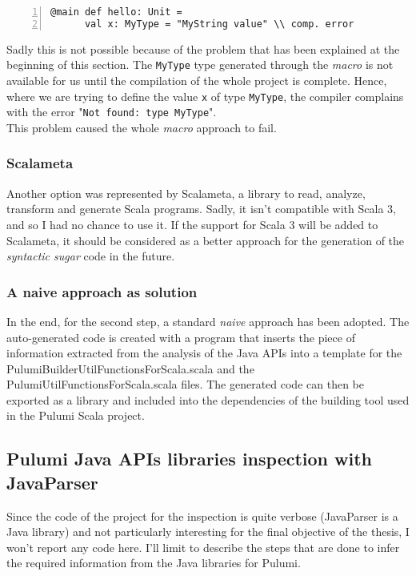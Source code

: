 \begin{minipage}{\linewidth}
  \begin{lstlisting}[numbers=left, numberstyle=\tiny, numbersep=-5pt, stepnumber=1]
    @main def hello: Unit = 
      val x: MyType = "MyString value" \\ comp. error
  \end{lstlisting}
\end{minipage}
Sadly this is not possible because of the problem that has been explained at the beginning of this section.
The \texttt{MyType} type generated through the \textit{macro} is not available for us until the compilation of the whole project is complete.
Hence, where we are trying to define the value \texttt{x} of type \texttt{MyType}, the compiler complains with the error "\texttt{Not found: type MyType}".\\
This problem caused the whole \textit{macro} approach to fail.


\subsubsection{Scalameta}
Another option was represented by Scalameta, a library to read, analyze, transform and generate Scala programs.
Sadly, it isn't compatible with Scala 3, and so I had no chance to use it.
If the support for Scala 3 will be added to Scalameta, it should be considered as a better approach for the generation of the \textit{syntactic sugar} code in the future.

\subsubsection{A naive approach as solution}
In the end, for the second step, a standard \textit{naive} approach has been adopted.
The auto-generated code is created with a program that inserts the piece of information extracted from the analysis of the Java APIs into a template for the PulumiBuilderUtilFunctionsForScala.scala and the PulumiUtilFunctionsForScala.scala files.
The generated code can then be exported as a library and included into the dependencies of the building tool used in the Pulumi Scala project.

\subsection{Pulumi Java APIs libraries inspection with JavaParser}
Since the code of the project for the inspection is quite verbose (JavaParser is a Java library) and not particularly interesting for the final objective of the thesis, I won't report any code here.
I'll limit to describe the steps that are done to infer the required information from the Java libraries for Pulumi.

